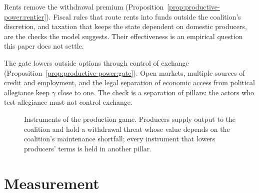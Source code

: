 \documentclass[11pt,letterpaper]{article}
\theoremstyle{definition}
\theoremstyle{remark}
\newcommand{\pF}{\mathsf{F}}
\newcommand{\pP}{\mathsf{P}}
\newcommand{\pI}{\mathsf{I}}
\newcommand{\pC}{\mathsf{C}}
\newcommand{\pW}{\mathsf{W}}
\newcommand{\HW}{H_{\pW}}
\begin{document}
Rents remove the withdrawal premium (Proposition~\ref{prop:productive-power:rentier}). Fiscal rules that route rents into funds outside the coalition's discretion, and taxation that keeps the state dependent on domestic producers, are the checks the model suggests. Their effectiveness is an empirical question this paper does not settle.

The gate lowers outside options through control of exchange (Proposition~\ref{prop:productive-power:gate}). Open markets, multiple sources of credit and employment, and the legal separation of economic access from political allegiance keep $\gamma$ close to one. The check is a separation of pillars: the actors who test allegiance must not control exchange.

\begin{figure}[t]
\centering
{}
\caption{Instruments of the production game. Producers supply output to the coalition and hold a withdrawal threat whose value depends on the coalition's maintenance shortfall; every instrument that lowers producers' terms is held in another pillar.}
\label{fig:instruments}
\end{figure}

\section{Measurement}
\label{sec:measurement}
\end{document}
